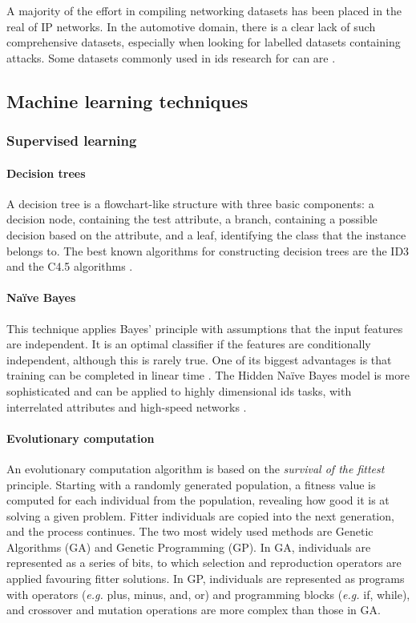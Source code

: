 A majority of the effort in compiling networking datasets has been placed in the real of IP networks. In the automotive domain, there is a clear lack of such comprehensive datasets, especially when looking for labelled datasets containing attacks. Some datasets commonly used in \gls{ids} research for \gls{can} are \cite{CANDataset_OTIDS, CANDataset_Car-Hacking, CANDataset_TUE, CANDataset_IEEE}.

\subsection{Machine learning techniques}
\label{subsec:machine_learning_techniques}

\subsubsection{Supervised learning}

\paragraph{Decision trees}
A decision tree is a flowchart-like structure with three basic components: a decision node, containing the test attribute, a branch, containing a possible decision based on the attribute, and a leaf, identifying the class that the instance belongs to. The best known algorithms for constructing decision trees are the ID3 and the C4.5 algorithms \citep{Badr2014, Buczak2016}.

\paragraph{Naïve Bayes}
This technique applies Bayes' principle with assumptions that the input features are independent. It is an optimal classifier if the features are conditionally independent, although this is rarely true. One of its biggest advantages is that training can be completed in linear time \citep{Buczak2016}. The Hidden Naïve Bayes model is more sophisticated and can be applied to highly dimensional \gls{ids} tasks, with interrelated attributes and high-speed networks \citep{Khraisat2019}.

\paragraph{Evolutionary computation}
An evolutionary computation algorithm is based on the \emph{survival of the fittest} principle. Starting with a randomly generated population, a fitness value is computed for each individual from the population, revealing how good it is at solving a given problem. Fitter individuals are copied into the next generation, and the process continues. The two most widely used methods are Genetic Algorithms (GA) and Genetic Programming (GP). In GA, individuals are represented as a series of bits, to which selection and reproduction operators are applied favouring fitter solutions. In GP, individuals are represented as programs with operators (\textit{e.g.} plus, minus, and, or) and programming blocks (\textit{e.g.} if, while), and crossover and mutation operations are more complex than those in GA.

